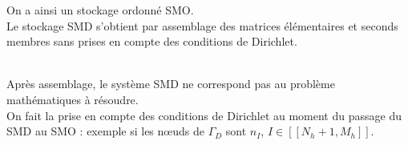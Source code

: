 \documentclass[12pt,a4paper]{article}
\begin{document}
	\noindent On a ainsi un stockage ordonné SMO.\\
	Le stockage SMD s'obtient par assemblage des matrices élémentaires et seconds membres sans prises en compte des conditions de Dirichlet.
	
	\\
	
	Après assemblage, le système SMD ne correspond pas au problème mathématiques à résoudre.\\
	On fait la prise en compte des conditions de Dirichlet au moment du passage du SMD au SMO : exemple si les nœuds de $\Gamma_D$ sont $n_I$, $I \in [\![N_h+1,M_h]\!]$.
	
\end{document}
